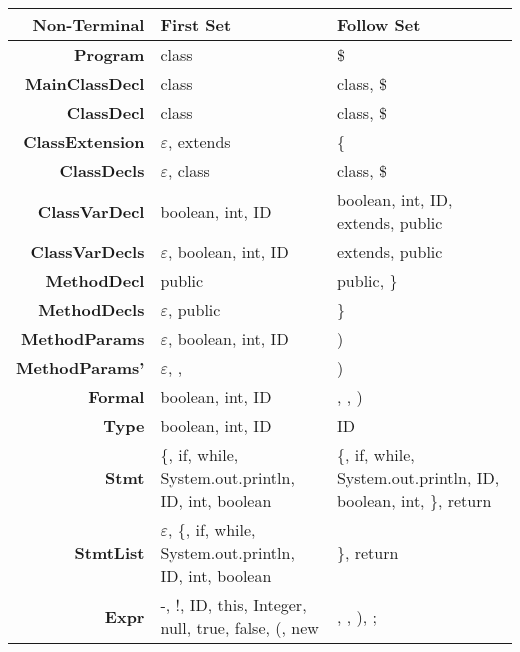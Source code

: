 \documentclass{report}
\begin{document}
%
\begin{tabularx}{\textwidth}{ r | R | R }

\textbf{Non-Terminal} & \textbf{First Set} & \textbf{Follow Set} \\
\hline

\textbf{Program} 
& class 
& \$ 
\\[1ex]

\textbf{MainClassDecl} 
& class 
& class, \$
\\[1ex]

\textbf{ClassDecl} 
& class 
& class, \$
\\[1ex] 

\textbf{ClassExtension}
& $\varepsilon$, extends
& \{
\\[1ex]

\textbf{ClassDecls}
& $\varepsilon$, class
& class, \$
\\[1ex]

\textbf{ClassVarDecl} 
& boolean, int, ID 
& boolean, int, ID, extends, public 
\\[1ex]

\textbf{ClassVarDecls}
& $\varepsilon$, boolean, int, ID
& extends, public
\\[1ex]

\textbf{MethodDecl} 
& public 
& public, \}
\\[1ex]

\textbf{MethodDecls}
& $\varepsilon$, public
& \}
\\[1ex]

\textbf{MethodParams}
& $\varepsilon$, boolean, int, ID
& )
\\[1ex]

\textbf{MethodParams'}
& $\varepsilon$, ,
& )
\\[1ex]

\textbf{Formal} 
& boolean, int, ID 
& , , )
\\[1ex] 

\textbf{Type} 
& boolean, int, ID 
& ID 
\\[1ex]

\textbf{Stmt} 
& \{, if, while, System.out.println, ID, int, boolean 
& \{, if, while, System.out.println, ID, boolean, int, \}, return 
\\[1ex]

\textbf{StmtList}
& $\varepsilon$, \{, if, while, System.out.println, ID, int, boolean 
& \}, return
\\[1ex]

\textbf{Expr} 
& -, !, ID, this, Integer, null, true, false, (, new 
& , , ), ; 
\\[1ex]


\end{tabularx}
\end{document}
